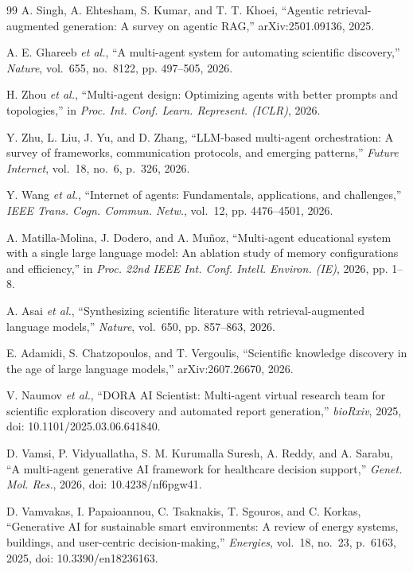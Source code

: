 \documentclass[conference]{IEEEtran}
\begin{document}
\begin{thebibliography}{99}
A. Singh, A. Ehtesham, S. Kumar, and T. T. Khoei, ``Agentic
retrieval-augmented generation: A survey on agentic RAG,'' arXiv:2501.09136,
2025.

A. E. Ghareeb \emph{et al.}, ``A multi-agent system for automating scientific
discovery,'' \emph{Nature}, vol.~655, no.~8122, pp. 497--505, 2026.

H. Zhou \emph{et al.}, ``Multi-agent design: Optimizing agents with better
prompts and topologies,'' in \emph{Proc. Int. Conf. Learn. Represent. (ICLR)},
2026.

Y. Zhu, L. Liu, J. Yu, and D. Zhang, ``LLM-based multi-agent orchestration: A
survey of frameworks, communication protocols, and emerging patterns,''
\emph{Future Internet}, vol.~18, no.~6, p.~326, 2026.

Y. Wang \emph{et al.}, ``Internet of agents: Fundamentals, applications, and
challenges,'' \emph{IEEE Trans. Cogn. Commun. Netw.}, vol.~12, pp.
4476--4501, 2026.

A. Matilla-Molina, J. Dodero, and A. Mu\~{n}oz, ``Multi-agent educational
system with a single large language model: An ablation study of memory
configurations and efficiency,'' in \emph{Proc. 22nd IEEE Int. Conf. Intell.
Environ. (IE)}, 2026, pp. 1--8.

A. Asai \emph{et al.}, ``Synthesizing scientific literature with retrieval-augmented language models,'' \emph{Nature}, vol.~650, pp. 857--863, 2026.

E. Adamidi, S. Chatzopoulos, and T. Vergoulis, ``Scientific knowledge discovery in the age of large language models,'' arXiv:2607.26670, 2026.

V. Naumov \emph{et al.}, ``DORA AI Scientist: Multi-agent virtual research team for scientific exploration discovery and automated report generation,'' \emph{bioRxiv}, 2025, doi: 10.1101/2025.03.06.641840.

D. Vamsi, P. Vidyuallatha, S. M. Kurumalla Suresh, A. Reddy, and A. Sarabu, ``A multi-agent generative AI framework for healthcare decision support,'' \emph{Genet. Mol. Res.}, 2026, doi: 10.4238/nf6pgw41.

D. Vamvakas, I. Papaioannou, C. Tsaknakis, T. Sgouros, and C. Korkas, ``Generative AI for sustainable smart environments: A review of energy systems, buildings, and user-centric decision-making,'' \emph{Energies}, vol.~18, no.~23, p.~6163, 2025, doi: 10.3390/en18236163.
\end{thebibliography}
\end{document}
